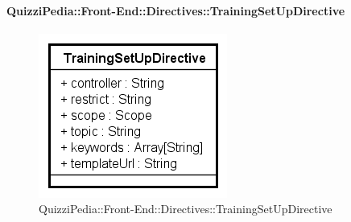 
		\paragraph{QuizziPedia::Front-End::Directives::TrainingSetUpDirective}
		
		\label{QuizziPedia::Front-End::Directives::TrainingSetUpDirective}
		
		\begin{figure}[ht]
			\centering
			\includegraphics[scale=0.80,keepaspectratio]{UML/Classi/Front-End/QuizziPedia_Front-end_Templates_TrainingSetUpTemplate.png}
			\caption{QuizziPedia::Front-End::Directives::TrainingSetUpDirective}
		\end{figure} \FloatBarrier
		
